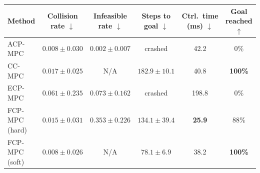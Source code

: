 \begin{tabular}{lccccc}
\hline
Method &
Collision rate $\downarrow$ &
Infeasible rate $\downarrow$ &
Steps to goal $\downarrow$ &
Ctrl.\ time (ms) $\downarrow$ &
Goal reached $\uparrow$ \\
\hline
ACP-MPC~\cite{dixit2023adaptive}
& \textbf{$0.008\pm0.030$}
& \textbf{$0.002\pm0.007$}
& crashed
& 42.2
& 0\% \\
CC-MPC~\cite{lekeufack2024decision}
& $0.017\pm0.025$
& N/A
& $182.9\pm10.1$
& 40.8
& \textbf{100\%} \\
ECP-MPC~\cite{shin2025egocentric}
& $0.061\pm0.235$
& $0.073\pm0.162$
& crashed
& 198.8
& 0\% \\
FCP-MPC (hard)
& $0.015\pm0.031$
& $0.353\pm0.226$
& $134.1\pm39.4$
& \textbf{25.9}
& 88\% \\
FCP-MPC (soft)
& $0.008\pm0.026$
& N/A
& \textbf{$78.1\pm6.9$}
& 38.2
& \textbf{100\%} \\
\hline
\end{tabular}
